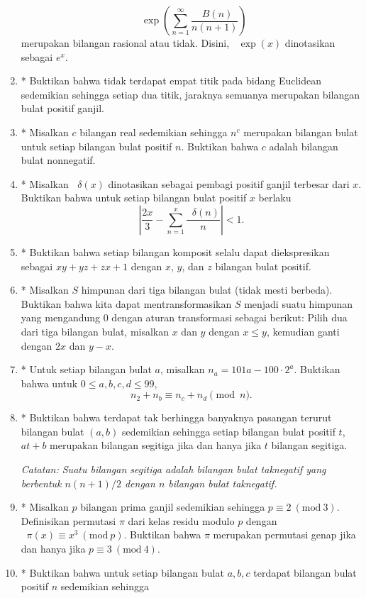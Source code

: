 \documentclass[12pt]{article}
\newcommand*\func[2]{\mathop{}\!{#1}{\left({#2}\right)}}
\newcommand{\Mod}[1]{\ (\mathrm{mod}\ #1)}
\begin{document}
\begin{enumerate}[leftmargin=*]
		\[ \func{\exp}{\sum_{n = 1}^{\infty}{\frac{\func{B}{n}}{n\left(n + 1\right)}}} \]
		merupakan bilangan rasional atau tidak. Disini, $ \func{\exp}{x} $ dinotasikan sebagai $ e^{x} $.
		\item* Buktikan bahwa tidak terdapat empat titik pada bidang Euclidean sedemikian sehingga setiap dua titik, jaraknya semuanya merupakan bilangan bulat positif ganjil.
		\item* Misalkan $ c $ bilangan real sedemikian sehingga $ n^{c} $ merupakan bilangan bulat untuk setiap bilangan bulat positif $ n $. Buktikan bahwa $ c $ adalah bilangan bulat nonnegatif.
		\item* Misalkan $ \func{\delta}{x} $ dinotasikan sebagai pembagi positif ganjil terbesar dari $ x $. Buktikan bahwa untuk setiap bilangan bulat positif $ x $ berlaku
		\[ \left|\frac{2x}{3} - \sum_{n = 1}^{x}{\frac{\func{\delta}{n}}{n}}\right| < 1. \]
		\item* Buktikan bahwa setiap bilangan komposit selalu dapat diekspresikan sebagai $ xy + yz + zx + 1 $ dengan $ x $, $ y $, dan $ z $ bilangan bulat positif.
		\item* Misalkan $ S $ himpunan dari tiga bilangan bulat (tidak mesti berbeda). Buktikan bahwa kita dapat mentransformasikan $ S $ menjadi suatu himpunan yang mengandung 0 dengan aturan transformasi sebagai berikut: Pilih dua dari tiga bilangan bulat, misalkan $ x $ dan $ y $ dengan $ x \leq y $, kemudian ganti dengan $ 2x $ dan $ y - x $.
		\item* Untuk setiap bilangan bulat $ a $, misalkan $ n_{a} = 101a - 100 \cdot 2^{a} $. Buktikan bahwa untuk $ 0 \leq a, b, c, d \leq 99 $,
		\[ n_{2} + n_{b} \equiv n_{c} + n_{d} \pmod{n}. \]
		\item* Buktikan bahwa terdapat tak berhingga banyaknya pasangan terurut bilangan bulat $ \left(a, b\right) $ sedemikian sehingga setiap bilangan bulat positif $ t $, $ at + b $ merupakan bilangan segitiga jika dan hanya jika $ t $ bilangan segitiga.
		\par \noindent \textit{Catatan: Suatu bilangan segitiga adalah bilangan bulat taknegatif yang berbentuk $ n\left(n + 1\right)/2 $ dengan $ n $ bilangan bulat taknegatif.}
		\item* Misalkan $ p $ bilangan prima ganjil sedemikian sehingga $ p \equiv 2 \Mod{3} $. Definisikan permutasi $ \pi $ dari kelas residu modulo $ p $ dengan $ \func{\pi}{x} \equiv x^{3} \Mod{p} $. Buktikan bahwa $ \pi $ merupakan permutasi genap jika dan hanya jika $ p \equiv 3 \Mod{4} $.
		\item* Buktikan bahwa untuk setiap bilangan bulat $ a, b, c $ terdapat bilangan bulat positif $ n $ sedemikian sehingga

\end{enumerate}
\end{document}
